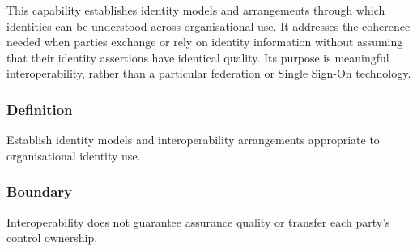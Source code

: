 This capability establishes identity models and arrangements through which identities can be understood across organisational use. It addresses the coherence needed when parties exchange or rely on identity information without assuming that their identity assertions have identical quality. Its purpose is meaningful interoperability, rather than a particular federation or Single Sign-On technology.

\subsubsection*{Definition}

Establish identity models and interoperability arrangements appropriate to organisational identity use.

\subsubsection*{Boundary}

Interoperability does not guarantee assurance quality or transfer each party's control ownership.

